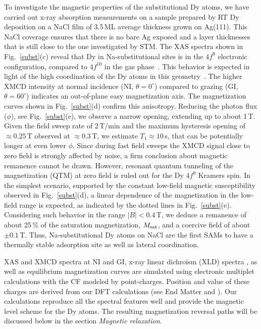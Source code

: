 {To investigate the magnetic properties of the substitutional Dy atoms, we have carried out x-ray absorption measurements on a sample prepared by RT Dy deposition on a NaCl film of 3.5\,ML average thickness grown on Ag(111). This NaCl coverage ensures that there is no bare Ag exposed and a layer thicknesses that is still close to the one investigated by STM. The XAS spectra shown in Fig.~\ref{subst}(c) reveal that Dy in Na-substitutional sites is in the $4f^{9}$ electronic configuration, compared to $4f^{10}$ in the gas phase~\cite{sin17, don21}. This behavior is expected in light of the high coordination of the Dy atoms in this geometry~\cite{bal18, joh79, bre93, pet15}. The higher XMCD intensity at normal incidence (NI, $\theta=0^{\circ}$) compared to grazing (GI, $\theta=60^{\circ}$) indicates an out-of-plane easy magnetization axis. The magnetization curves shown in Fig.~\ref{subst}(d) confirm this anisotropy. Reducing the photon flux ($\phi$), see Fig.~\ref{subst}(e), we observe a narrow opening, extending up to about 1\,T. Given the field sweep rate of 2\,T/min and the maximum hysteresis opening of $\approx 0.25$\,T observed at $\approx 0.3$\,T, we estimate $T_1 \approx 10$\,s, that can be potentially longer at even lower $\phi$.
Since during fast field sweeps the XMCD signal close to zero field is strongly affected by noise, a firm conclusion about magnetic remanence cannot be drawn. However, resonant quantum tunneling of the magnetization (QTM) at zero field is ruled out for the Dy $4f^9$ Kramers spin. In the simplest scenario, supported by the constant low-field  magnetic susceptibility observed in Fig.~\ref{subst}(d), a linear dependence of the magnetization in the low-field range is expected, as indicated by the dotted lines in Fig.~\ref{subst}(e). Considering such behavior in the range $|B| < 0.4$\,T, we deduce a remanence of about 25\,\% of the saturation magnetization, $M_{\rm sat}$, and a coercive field of about $\pm0.1$\,T. Thus, Na-substitutional Dy atoms on NaCl are the first SAMs to have a thermally stable adsorption site as well as lateral coordination.

XAS and XMCD spectra at NI and GI, x-ray linear dichroism (XLD) spectra \cite{SM}, as well as equilibrium magnetization curves are simulated using electronic multiplet calculations with the CF modeled by point-charges. Position and value of these charges are derived from our DFT calculations (see End Matter and \cite{SM}). Our  calculations reproduce all the spectral features well and provide the magnetic level scheme for the Dy atoms.
The resulting magnetization reversal paths will be discussed below in the section \textit{Magnetic relaxation}.



}
